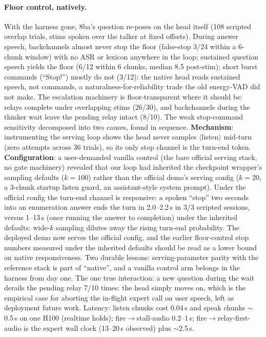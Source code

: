 \paragraph{Floor control, natively.} With the harness gone, 8ba's
question re-poses on the head itself (108 scripted overlap trials,
stims spoken over the talker at fixed offsets). During answer speech,
backchannels almost never stop the floor (false-stop 3/24 within a
6-chunk window) with no ASR or lexicon anywhere in the loop;
sustained question speech yields the floor (6/12 within 6 chunks,
median 8.5 post-stim); short burst commands (``Stop!'') mostly do not
(3/12): the native head reads sustained speech, not commands, a
naturalness-for-reliability trade the old energy-VAD did not make.
The escalation machinery is floor-transparent where it should be:
relays complete under overlapping stims (26/30), and backchannels
during the thinker wait leave the pending relay intact (8/10).
The weak stop-command sensitivity decomposed into two causes, found
in sequence. \textbf{Mechanism}: instrumenting the serving loop shows
the head never samples $\langle$listen$\rangle$ mid-turn (zero
attempts across 36 trials), so its only stop channel is the
turn-end token. \textbf{Configuration}: a user-demanded vanilla control
(the bare official serving stack, no gate machinery) revealed that
our loop had inherited the checkpoint wrapper's sampling defaults
($k{=}100$) rather than the official demo's serving config
($k{=}20$, a 3-chunk startup listen guard, an assistant-style system
prompt). Under the official config the turn-end channel is
responsive: a spoken ``stop'' two seconds into an enumeration
answer ends the turn in 2.0--2.2\,s in 3/3 scripted sessions, versus
1--13\,s (once running the answer to completion) under the inherited
defaults: wide-$k$ sampling dilutes away the rising turn-end
probability. The deployed demo now serves the official config, and
the earlier floor-control stop numbers measured under the inherited
defaults should be read as a lower bound on native responsiveness.
Two durable lessons: serving-parameter parity with the reference
stack is part of ``native'', and a vanilla control arm belongs in the
harness from day one. The
one true interaction: a new question during the wait derails
the pending relay 7/10 times: the head simply moves on, which is
the empirical case for aborting the in-flight expert call on user
speech, left as deployment future work. Latency: listen chunks cost
0.04\,s and speak chunks $\sim$0.5\,s on one H100 (realtime holds);
fire$\to$stall-audio 0.2--1\,s; fire$\to$relay-first-audio is the
expert wall clock (13--20\,s observed) plus $\sim$2.5\,s.

